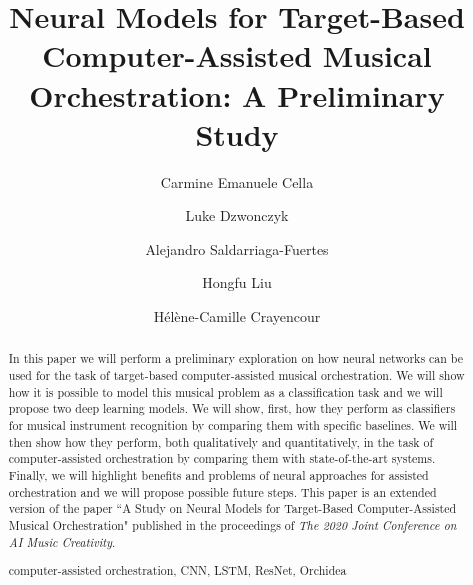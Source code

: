 \documentclass[runningheads,a4paper]{llncs}
\newcommand{\keywords}[1]{\par\addvspace\baselineskip
\noindent\keywordname\enspace\ignorespaces#1}
\begin{document}
\mainmatter  %

\title{Neural Models for Target-Based Computer-Assisted Musical Orchestration: A Preliminary Study}


%
%
\author{Carmine Emanuele Cella\and Luke Dzwonczyk\and Alejandro Saldarriaga-Fuertes\and Hongfu Liu\and H\'el\`ene-Camille Crayencour}
%



%
%

\maketitle

\begin{abstract}
In this paper we will perform a preliminary exploration on how neural networks can be used for the task of target-based computer-assisted musical orchestration. We will show how it is possible to model this  musical problem as a classification task and we will propose two deep learning models. We will show, first, how they perform as classifiers for musical instrument recognition by comparing them with specific baselines. We will then show how they perform, both qualitatively and quantitatively, in the task of computer-assisted orchestration by comparing them with state-of-the-art systems. Finally, we will highlight benefits and problems of neural approaches for assisted orchestration and we will propose possible future steps. This paper is an extended version of the paper ``A Study on Neural Models for Target-Based Computer-Assisted Musical Orchestration" published in the proceedings of \textit{The 2020 Joint Conference on AI Music Creativity}. 

\keywords{computer-assisted orchestration, CNN, LSTM, ResNet, Orchidea}

\end{abstract}
\end{document}
